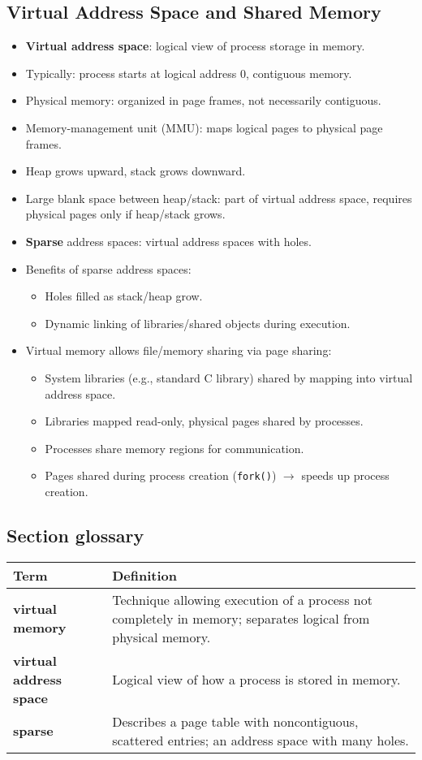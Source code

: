 \subsection{Virtual Address Space and Shared Memory}
\begin{itemize}
    \item \textbf{Virtual address space}: logical view of process storage in memory.
    \item Typically: process starts at logical address 0, contiguous memory.
    \item Physical memory: organized in page frames, not necessarily contiguous.
    \item Memory-management unit (MMU): maps logical pages to physical page frames.
    \item Heap grows upward, stack grows downward.
    \item Large blank space between heap/stack: part of virtual address space, requires physical pages only if heap/stack grows.
    \item \textbf{Sparse} address spaces: virtual address spaces with holes.
    \item Benefits of sparse address spaces:
    \begin{itemize}
        \item Holes filled as stack/heap grow.
        \item Dynamic linking of libraries/shared objects during execution.
    \end{itemize}
    \item Virtual memory allows file/memory sharing via page sharing:
    \begin{itemize}
        \item System libraries (e.g., standard C library) shared by mapping into virtual address space.
        \item Libraries mapped read-only, physical pages shared by processes.
        \item Processes share memory regions for communication.
        \item Pages shared during process creation (\texttt{fork()}) $\rightarrow$ speeds up process creation.
    \end{itemize}
\end{itemize}

\subsection*{Section glossary}
\begin{tabular}{p{}p{}}
    \toprule
    \textbf{Term} & \textbf{Definition} \\
    \midrule
    \textbf{virtual memory} & Technique allowing execution of a process not completely in memory; separates logical from physical memory. \\
    \textbf{virtual address space} & Logical view of how a process is stored in memory. \\
    \textbf{sparse} & Describes a page table with noncontiguous, scattered entries; an address space with many holes. \\
    \bottomrule
\end{tabular}
